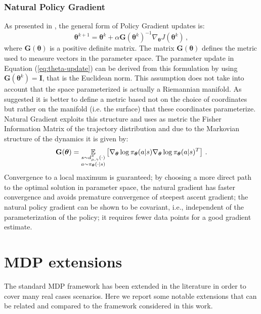 \subsubsection{Natural Policy Gradient}
As presented in \citep{NIPS2012_4576}, the general form of Policy Gradient updates is:
\begin{equation}
	\boldsymbol{\theta}^{k+1} = \boldsymbol{\theta}^k + \alpha \mathbf{G}(\boldsymbol{\theta}^k)^{-1}\nabla_{\boldsymbol{\theta}} J(\boldsymbol{\theta}^k) \, ,
\end{equation}
 where $\mathbf{G}(\boldsymbol{\theta})$ is a positive definite matrix. The matrix $\mathbf{G}(\boldsymbol{\theta})$ defines the metric used to measure vectors in the parameter space. The parameter update in Equation (\ref{eq:theta-update}) can be derived from this formulation by using $\mathbf{G}(\boldsymbol{\theta}^k)=\boldsymbol{I}$, that is the Euclidean norm. This assumption does not take into account that the space parameterized is actually a Riemannian manifold. As \citep{amari_1998} suggested it is better to define a metric based not on the choice of coordinates but rather on the manifold (i.e. the surface) that these coordinates parameterize. 
 Natural Gradient \citep{kakade_natural_2002} exploits this structure and uses as metric the Fisher Information Matrix of the trajectory distribution and due to the Markovian structure of the dynamics it is given by:
\begin{equation}
	\mathbf{G}(\boldsymbol{\theta}) = \underset{\begin{subarray}{c}
	s \sim d_{\mu,\gamma}^\pi(\cdot) \\
	a \sim \pi_{\boldsymbol{\theta}}(\cdot | s)	
	\end{subarray}
	}{\mathbb{E}} \left[ \nabla_{\boldsymbol{\theta}} \log \pi_{\boldsymbol{\theta}} (a |s) \nabla_{\boldsymbol{\theta}} \log \pi_{\boldsymbol{\theta}} (a |s)^T \right] \, . 
\end{equation}
Convergence to a local maximum is guaranteed; by choosing a more direct path to the optimal solution in parameter space, the natural gradient has faster convergence and avoids premature convergence of steepest ascent gradient; the natural policy gradient can be shown to be covariant, i.e., independent of the parameterization of the policy; it requires fewer data points for a good gradient estimate.

\clearpage


\section{MDP extensions}\label{sec:mdp-ext}
The standard MDP framework has been extended in the literature in order to cover many real cases scenarios. Here we report some notable extensions that can be related and compared to the framework considered in this work.



